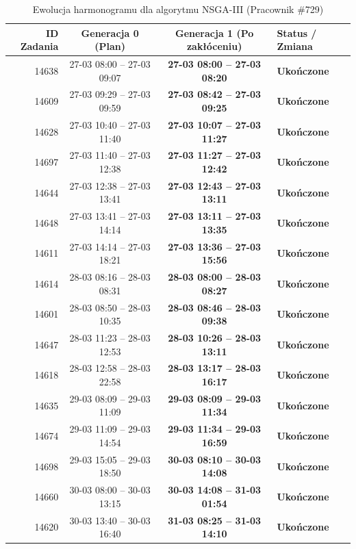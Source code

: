 \begin{table}[htbp]
\centering\small
\caption{Ewolucja harmonogramu dla algorytmu NSGA-III (Pracownik \#729)}
\label{tab:case_study_nsgaiii_u729}
\begin{tabular}{|r|c|c|l|}
\hline
\textbf{ID Zadania} & \textbf{Generacja 0 (Plan)} & \textbf{Generacja 1 (Po zakłóceniu)} & \textbf{Status / Zmiana} \\ \hline
14638 & 27-03 08:00 -- 27-03 09:07 & \textbf{27-03 08:00 -- 27-03 08:20} & \textbf{Ukończone} \\ 
14609 & 27-03 09:29 -- 27-03 09:59 & \textbf{27-03 08:42 -- 27-03 09:25} & \textbf{Ukończone} \\ 
14628 & 27-03 10:40 -- 27-03 11:40 & \textbf{27-03 10:07 -- 27-03 11:27} & \textbf{Ukończone} \\ 
14697 & 27-03 11:40 -- 27-03 12:38 & \textbf{27-03 11:27 -- 27-03 12:42} & \textbf{Ukończone} \\ 
14644 & 27-03 12:38 -- 27-03 13:41 & \textbf{27-03 12:43 -- 27-03 13:11} & \textbf{Ukończone} \\ 
14648 & 27-03 13:41 -- 27-03 14:14 & \textbf{27-03 13:11 -- 27-03 13:35} & \textbf{Ukończone} \\ 
14611 & 27-03 14:14 -- 27-03 18:21 & \textbf{27-03 13:36 -- 27-03 15:56} & \textbf{Ukończone} \\ 
14614 & 28-03 08:16 -- 28-03 08:31 & \textbf{28-03 08:00 -- 28-03 08:27} & \textbf{Ukończone} \\ 
14601 & 28-03 08:50 -- 28-03 10:35 & \textbf{28-03 08:46 -- 28-03 09:38} & \textbf{Ukończone} \\ 
14647 & 28-03 11:23 -- 28-03 12:53 & \textbf{28-03 10:26 -- 28-03 13:11} & \textbf{Ukończone} \\ 
14618 & 28-03 12:58 -- 28-03 22:58 & \textbf{28-03 13:17 -- 28-03 16:17} & \textbf{Ukończone} \\ 
14635 & 29-03 08:09 -- 29-03 11:09 & \textbf{29-03 08:09 -- 29-03 11:34} & \textbf{Ukończone} \\ 
14674 & 29-03 11:09 -- 29-03 14:54 & \textbf{29-03 11:34 -- 29-03 16:59} & \textbf{Ukończone} \\ 
14698 & 29-03 15:05 -- 29-03 18:50 & \textbf{30-03 08:10 -- 30-03 14:08} & \textbf{Ukończone} \\ 
14660 & 30-03 08:00 -- 30-03 13:15 & \textbf{30-03 14:08 -- 31-03 01:54} & \textbf{Ukończone} \\ 
14620 & 30-03 13:40 -- 30-03 16:40 & \textbf{31-03 08:25 -- 31-03 14:10} & \textbf{Ukończone} \\ 

\end{tabular}
\end{table}
